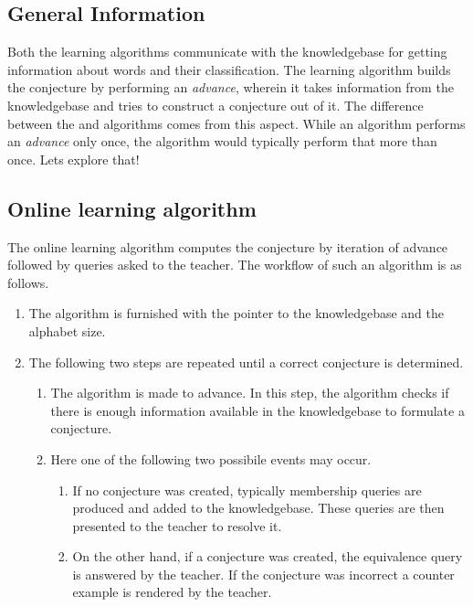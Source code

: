 \subsection{General Information}
Both the learning algorithms communicate with the knowledgebase for getting information about words and their classification. The learning algorithm builds the conjecture by performing an \emph{advance}, wherein it takes information from the knowledgebase and tries to construct a conjecture out of it. The difference between the \online and \offline algorithms comes from this aspect. While an \offline algorithm performs an \emph{advance} only once, the \online algorithm would typically perform that more than once. Lets explore that!

\subsection{Online learning algorithm}
The online learning algorithm computes the conjecture by iteration of advance followed by queries asked to the teacher. The workflow of such an algorithm is as follows. \\

\begin{enumerate}
 \item The algorithm is furnished with the pointer to the knowledgebase and the alphabet size.
 \item The following two steps are repeated until a correct conjecture is determined.
	\begin{enumerate}
	    \item The algorithm is made to advance. In this step, the algorithm checks if there is enough information available in the knowledgebase to formulate a conjecture.
	    \item Here one of the following two possibile events may occur.
	    \begin{enumerate}
	    \item If no conjecture was created, typically membership queries are produced and added to the knowledgebase. These queries are then presented to the teacher to resolve it.
	    \item On the other hand, if a conjecture was created, the equivalence query is answered by the teacher. If the conjecture was incorrect a counter example is rendered by the teacher.
	    \end{enumerate}
	\end{enumerate}
\end{enumerate}
